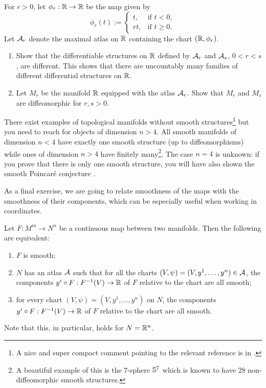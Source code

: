 \begin{exercise}
  For $r>0$, let $\phi_r:\mathbb{R}\to\mathbb{R}$ be the map given by
  \begin{equation}
    \phi_r(t) := \begin{cases}
      t,  & \mbox{if } t<0,    \\
      rt, & \mbox{if } t\geq0.
    \end{cases}
  \end{equation}
  Let $\mathcal{A}_r$ denote the maximal atlas on $\mathbb{R}$ containing the chart $(\mathbb{R}, \phi_r)$.
  \begin{enumerate}
    \item Show that the differentiable structures on $\mathbb{R}$ defined by $\mathcal{A}_r$ and $\mathcal{A}_s$, $0<r<s$, are different.
          This shows that there are uncountably many families of different differential structures on $\mathbb{R}$.
    \item Let $M_r$ be the manifold $\mathbb{R}$ equipped with the atlas $\mathcal{A}_r$.
          Show that $M_r$ and $M_s$ are diffeomorphic for $r,s >0$.
  \end{enumerate}
\end{exercise}

\begin{remark}\label{remark:smoothstr}
  There exist examples of topological manifolds without smooth structures\footnote{A nice and super compact comment pointing to the relevant reference is in \cite{SE2691140}.} but you need to reach for objects of dimension $n > 4$.
  All smooth manifolds of dimension $n < 4$ have exactly one smooth structure (up to diffeomorphisms) while ones of dimension $n > 4$ have finitely many\footnote{A beautiful example of this is the $7$-sphere $\mathbb{S}^7$ which is known to have 28 non-diffeomorphic smooth structures.}.
  The case $n = 4$ is unknown: if you prove that there is only one smooth structure, you will have also shown the smooth Poincar\'e conjecture \cite{notes:calegari, article:quanta:topology}.
\end{remark}

As a final exercise, we are going to relate smoothness of the maps with the smoothness of their components, which can be especially useful when working in coordinates.

\begin{exercise}
  Let $F: M^m \to N^n$ be a continuous map between two manifolds. Then the following are equivalent:
  \begin{enumerate}
    \item $F$ is smooth;
    \item $N$ has an atlas $\mathcal{A}$ such that for all the charts $(V, \psi) = (V, y^1, \ldots, y^n)\in \mathcal{A}$, the components $y^i \circ F: F^{-1}(V) \to \mathbb{R}$ of $F$ relative to the chart are all smooth;
    \item for every chart $(V, \psi) = (V, y^1, \ldots, y^n)$ on $N$, the components $y^i \circ F: F^{-1}(V) \to \mathbb{R}$ of $F$ relative to the chart are all smooth.
  \end{enumerate}
  Note that this, in particular, holds for $N=\mathbb{R}^n$.
\end{exercise}

